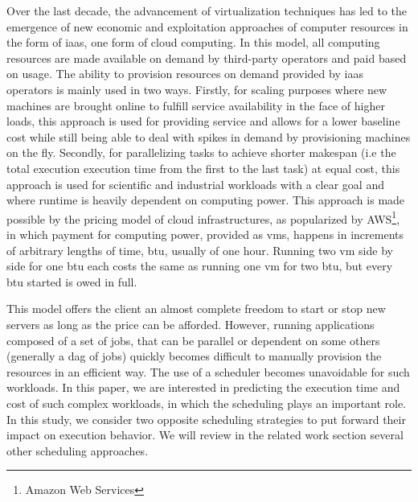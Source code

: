 \documentclass[10pt,conference,compsocconf]{IEEEtran}
\begin{document}
Over the  last decade, the advancement  of virtualization techniques has  led to
the emergence of new economic  and exploitation approaches of computer resources
in  the form  of \ac{iaas},  one form  of cloud  computing. In  this model,  all
computing resources  are made available  on demand by third-party  operators and
paid based on  usage.  The ability to provision resources  on demand provided by
\ac{iaas} operators is  mainly used in two ways.  Firstly,  for scaling purposes
where new  machines are brought  online to  fulfill service availability  in the
face of higher loads, this approach is used for providing service and allows for
a lower baseline  cost while still being  able to deal with spikes  in demand by
provisioning machines on  the fly. Secondly, for parallelizing  tasks to achieve
shorter makespan (i.e  the total execution execution time from  the first to the
last task)  at equal cost, this  approach is used for  scientific and industrial
workloads with a clear goal and  where runtime is heavily dependent on computing
power.   This  approach  is  made  possible   by  the  pricing  model  of  cloud
infrastructures, as  popularized by AWS\footnote{Amazon Web  Services}, in which
payment  for computing  power, provided  as \acp{vm},  happens in  increments of
arbitrary lengths  of time, \ac{btu}, usually  of one hour. Running  two \ac{vm}
side by side for one \ac{btu} each costs the same as running one \ac{vm} for two
\ac{btu}, but every \ac{btu} started is owed in full.

This model  offers the client  an almost complete freedom  to start or  stop new
servers as  long as  the price  can be  afforded. However,  running applications
composed of  a set of  jobs, that  can be parallel  or dependent on  some others
(generally a \ac{dag}  of jobs) quickly becomes difficult  to manually provision
the resources  in an efficient way.  The use of a  scheduler becomes unavoidable
for  such  workloads.  In  this  paper,  we  are  interested in  predicting  the
execution time and cost of such complex workloads, in which the scheduling plays
an  important  role.   In  this  study,  we  consider  two  opposite  scheduling
strategies to put forward their impact  on execution behavior. We will review in
the related work section several other scheduling approaches.
\end{document}
